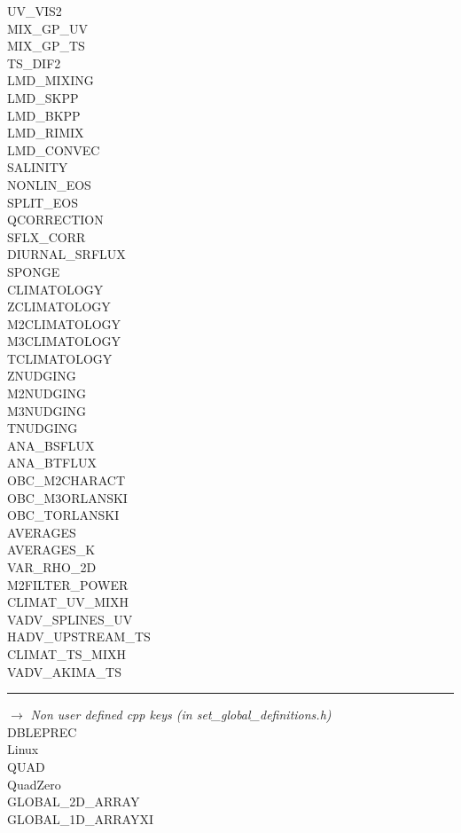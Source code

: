 UV\_VIS2\\
MIX\_GP\_UV\\
MIX\_GP\_TS\\
TS\_DIF2\\
LMD\_MIXING\\
LMD\_SKPP\\
LMD\_BKPP\\
LMD\_RIMIX\\
LMD\_CONVEC\\
SALINITY\\
NONLIN\_EOS\\
SPLIT\_EOS\\
QCORRECTION\\
SFLX\_CORR\\
DIURNAL\_SRFLUX\\
SPONGE\\
CLIMATOLOGY\\
ZCLIMATOLOGY\\
M2CLIMATOLOGY\\
M3CLIMATOLOGY\\
TCLIMATOLOGY\\
ZNUDGING\\
M2NUDGING\\
M3NUDGING\\
TNUDGING\\
ANA\_BSFLUX\\
ANA\_BTFLUX\\
OBC\_M2CHARACT\\
OBC\_M3ORLANSKI\\
OBC\_TORLANSKI\\
AVERAGES\\
AVERAGES\_K\\
VAR\_RHO\_2D\\
M2FILTER\_POWER\\
CLIMAT\_UV\_MIXH\\
VADV\_SPLINES\_UV\\
HADV\_UPSTREAM\_TS\\
CLIMAT\_TS\_MIXH\\
VADV\_AKIMA\_TS
\vspace{0.2cm}
\hrule
\noindent $\rightarrow$ \textit{Non user defined cpp keys (in set\_global\_definitions.h)}\\
DBLEPREC\\
Linux\\
QUAD\\
QuadZero\\
GLOBAL\_2D\_ARRAY\\
GLOBAL\_1D\_ARRAYXI\\
